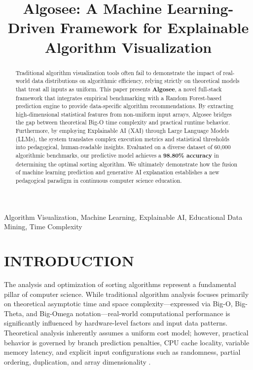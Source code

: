 \documentclass[conference]{IEEEtran}
\begin{document}
\title{Algosee: A Machine Learning-Driven Framework for Explainable Algorithm Visualization}

\author{
}

\maketitle

\begin{abstract}
Traditional algorithm visualization tools often fail to demonstrate the impact of real-world data distributions on algorithmic efficiency, relying strictly on theoretical models that treat all inputs as uniform. This paper presents \textbf{Algosee}, a novel full-stack framework that integrates empirical benchmarking with a Random Forest-based prediction engine to provide data-specific algorithm recommendations. By extracting high-dimensional statistical features from non-uniform input arrays, Algosee bridges the gap between theoretical Big-O time complexity and practical runtime behavior. Furthermore, by employing Explainable AI (XAI) through Large Language Models (LLMs), the system translates complex execution metrics and statistical thresholds into pedagogical, human-readable insights. Evaluated on a diverse dataset of 60,000 algorithmic benchmarks, our predictive model achieves a \textbf{98.80\% accuracy} in determining the optimal sorting algorithm. We ultimately demonstrate how the fusion of machine learning prediction and generative AI explanation establishes a new pedagogical paradigm in continuous computer science education.
\end{abstract}

\begin{IEEEkeywords}
Algorithm Visualization, Machine Learning, Explainable AI, Educational Data Mining, Time Complexity
\end{IEEEkeywords}

\section{INTRODUCTION}
The analysis and optimization of sorting algorithms represent a fundamental pillar of computer science. While traditional algorithm analysis focuses primarily on theoretical asymptotic time and space complexity---expressed via Big-O, Big-Theta, and Big-Omega notation---real-world computational performance is significantly influenced by hardware-level factors and input data patterns. Theoretical analysis inherently assumes a uniform cost model; however, practical behavior is governed by branch prediction penalties, CPU cache locality, variable memory latency, and explicit input configurations such as randomness, partial ordering, duplication, and array dimensionality \cite{cormen_intro}.
\end{document}
